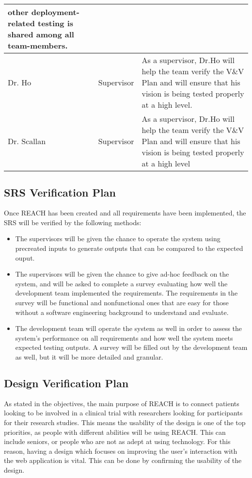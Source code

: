 \documentclass[12pt, titlepage]{article}
\begin{document}
\begin{table}[H]
\begin{tabular}{|p{1.4cm}|c|p{12.5cm}|}
        other deployment-related testing is shared among all team-members.\\
        \hline
        Dr. Ho & Supervisor & As a supervisor, Dr.Ho will help the team verify the V\&V Plan and will ensure that 
        his vision is being tested properly at a high level.\\
        \hline
        Dr. Scallan & Supervisor & As a supervisor, Dr.Ho will help the team verify the V\&V Plan and will 
        ensure that his vision is being tested properly at a high level \\       
        \hline
    \end{tabular}
\end{table}

\subsection{SRS Verification Plan}

Once REACH has been created and all requirements have been implemented, 
the SRS will be verified by the following methods:
\begin{itemize}
  \item The supervisors will be given the chance to operate the system using 
  precreated inputs to generate outputs that can be compared to the expected ouput. 
  \item The supervisors will be given the chance to give 
  ad-hoc feedback on the system, and will be asked to complete a survey evaluating how
  well the development team implemented the requirements. 
  The requirements in the survey will be functional and nonfunctional ones that are easy 
  for those without a software engineering background to understand and evaluate.

  \item The development team will operate the system as well in order to assess the system's
  performance on all requirements and how well the system meets expected testing outputs.
  A survey will be filled out by the development team as well, 
  but it will be more detailed and granular.
\end{itemize}
\subsection{Design Verification Plan}

As stated in the objectives, the main purpose of REACH is to connect patients looking to be 
involved in a clinical trial with researchers looking for participants for their research studies. 
This means the usability of the design is one of the top priorities, as people with different 
abilities will be using REACH. This can include seniors, or people who are not as adept at using 
technology. For this reason, having a design which focuses on improving the user's interaction 
with the web application is vital. This can be done by confirming the usability of the design.\\
\end{document}
